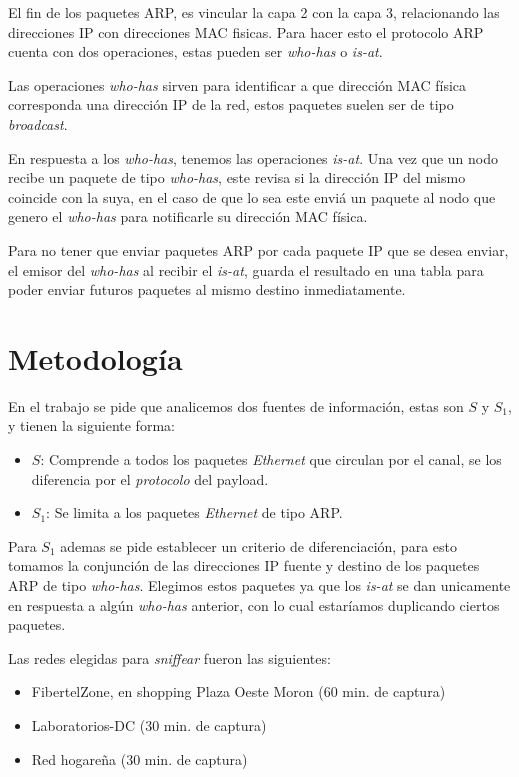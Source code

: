 El fin de los paquetes ARP, es vincular la capa 2 con la capa 3, relacionando las direcciones IP con direcciones MAC fisicas. Para hacer esto el protocolo ARP cuenta con dos operaciones, estas pueden ser \textit{who-has} o \textit{is-at}.

Las operaciones \textit{who-has} sirven para identificar a que dirección MAC física corresponda una dirección IP de la red, estos paquetes suelen ser de tipo \textit{broadcast}.

En respuesta a los \textit{who-has}, tenemos las operaciones \textit{is-at}. Una vez que un nodo recibe un paquete de tipo \textit{who-has}, este revisa si la dirección IP del mismo coincide con la suya, en el caso de que lo sea este enviá un paquete al nodo que genero el \textit{who-has} para notificarle su dirección MAC física.

Para no tener que enviar paquetes ARP por cada paquete IP que se desea enviar, el emisor del \textit{who-has} al recibir el \textit{is-at}, guarda el resultado en una tabla para poder enviar futuros paquetes al mismo destino inmediatamente.

\section{Metodología}

En el trabajo se pide que analicemos dos fuentes de información, estas son $S$ y $S_1$, y tienen la siguiente forma:

\begin{itemize}
	\item $S$: Comprende a todos los paquetes \textit{Ethernet} que circulan por el canal, se los diferencia por el \textit{protocolo} del payload.
	\item $S_1$: Se limita a los paquetes \textit{Ethernet} de tipo ARP.
\end{itemize}

\pagebreak

Para $S_1$ ademas se pide establecer un criterio de diferenciación, para esto tomamos la conjunción de las direcciones IP fuente y destino de los paquetes ARP de tipo \textit{who-has}. Elegimos estos paquetes ya que los \textit{is-at} se dan unicamente en respuesta a algún \textit{who-has} anterior, con lo cual estaríamos duplicando ciertos paquetes.

Las redes elegidas para \textit{sniffear} fueron las siguientes:

\begin{itemize}
	\item FibertelZone, en shopping Plaza Oeste Moron (60 min. de captura)
	\item Laboratorios-DC (30 min. de captura)
	\item Red hogareña (30 min. de captura)
\end{itemize}

